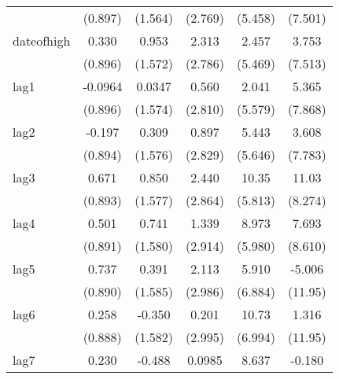 {\begin{tabular}{l*{5}{c}}
            &     (0.897)         &     (1.564)         &     (2.769)         &     (5.458)         &     (7.501)         \\
[1em]
dateofhigh  &       0.330         &       0.953         &       2.313         &       2.457         &       3.753         \\
            &     (0.896)         &     (1.572)         &     (2.786)         &     (5.469)         &     (7.513)         \\
[1em]
lag1        &     -0.0964         &      0.0347         &       0.560         &       2.041         &       5.365         \\
            &     (0.896)         &     (1.574)         &     (2.810)         &     (5.579)         &     (7.868)         \\
[1em]
lag2        &      -0.197         &       0.309         &       0.897         &       5.443         &       3.608         \\
            &     (0.894)         &     (1.576)         &     (2.829)         &     (5.646)         &     (7.783)         \\
[1em]
lag3        &       0.671         &       0.850         &       2.440         &       10.35         &       11.03         \\
            &     (0.893)         &     (1.577)         &     (2.864)         &     (5.813)         &     (8.274)         \\
[1em]
lag4        &       0.501         &       0.741         &       1.339         &       8.973         &       7.693         \\
            &     (0.891)         &     (1.580)         &     (2.914)         &     (5.980)         &     (8.610)         \\
[1em]
lag5        &       0.737         &       0.391         &       2.113         &       5.910         &      -5.006         \\
            &     (0.890)         &     (1.585)         &     (2.986)         &     (6.884)         &     (11.95)         \\
[1em]
lag6        &       0.258         &      -0.350         &       0.201         &       10.73         &       1.316         \\
            &     (0.888)         &     (1.582)         &     (2.995)         &     (6.994)         &     (11.95)         \\
[1em]
lag7        &       0.230         &      -0.488         &      0.0985         &       8.637         &      -0.180         \\

\end{tabular}}
